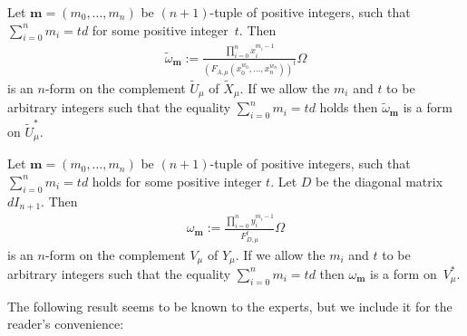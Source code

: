 \documentclass[pdftex]{sigma}
\numberwithin{equation}{section}
\begin{document}
\begin{notation}Let $\mathbf{m}=(m_0,\dots,m_n)$ be $(n+1)$-tuple of positive integers, such that $\sum\limits_{i=0}^n m_i =td$ for some positive integer~$t$. Then
\begin{gather*} \tilde{\omega}_{\mathbf{m}}:= \frac{\prod\limits_{i=0}^n x_i^{m_i-1}}{(F_{A,\mu}(x_0^{w_0},\dots,x_n^{w_n}))^t} \Omega\end{gather*}
is an $n$-form on the complement $\tilde{U}_{\mu}$ of $\tilde{X}_{\mu}$. If we allow the $m_i$ and $t$ to be arbitrary integers such that the equality $\sum\limits_{i=0}^n m_i=td$ holds then $\tilde{\omega}_{\mathbf{m}}$ is a form on $\tilde{U}^*_{\mu}$.

Let $\mathbf{m}=(m_0,\dots,m_n)$ be $(n+1)$-tuple of positive integers, such that $\sum\limits_{i=0}^n m_i =td$ holds for some positive integer $t$. Let $D$ be the diagonal matrix $d I_{n+1}$. Then
\begin{gather*} \omega_{\mathbf{m}}:= \frac{\prod\limits_{i=0}^n y_i^{m_i-1}}{F_{D,\mu}^t} \Omega\end{gather*}
is an $n$-form on the complement $V_{\mu}$ of $Y_{\mu}$. If we allow the $m_i$ and $t$ to be arbitrary integers such that the equality $\sum\limits_{i=0}^n m_i=td$ then $\omega_{\mathbf{m}}$ is a form on~$V^*_{\mu}$.
\end{notation}

The following result seems to be known to the experts, but we include it for the reader's convenience:
\end{document}
